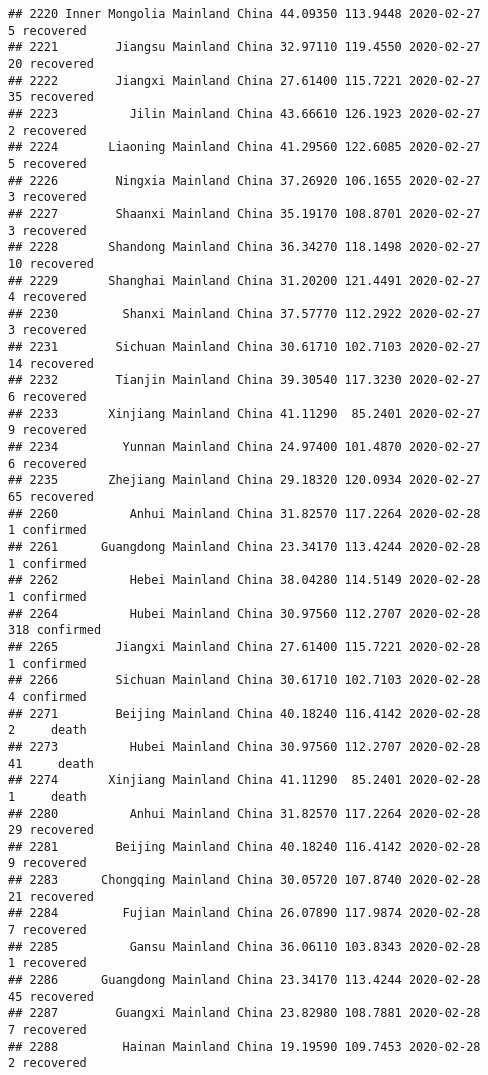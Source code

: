 \documentclass[
]{article}
\begin{document}
\begin{verbatim}
## 2220 Inner Mongolia Mainland China 44.09350 113.9448 2020-02-27     5 recovered
## 2221        Jiangsu Mainland China 32.97110 119.4550 2020-02-27    20 recovered
## 2222        Jiangxi Mainland China 27.61400 115.7221 2020-02-27    35 recovered
## 2223          Jilin Mainland China 43.66610 126.1923 2020-02-27     2 recovered
## 2224       Liaoning Mainland China 41.29560 122.6085 2020-02-27     5 recovered
## 2226        Ningxia Mainland China 37.26920 106.1655 2020-02-27     3 recovered
## 2227        Shaanxi Mainland China 35.19170 108.8701 2020-02-27     3 recovered
## 2228       Shandong Mainland China 36.34270 118.1498 2020-02-27    10 recovered
## 2229       Shanghai Mainland China 31.20200 121.4491 2020-02-27     4 recovered
## 2230         Shanxi Mainland China 37.57770 112.2922 2020-02-27     3 recovered
## 2231        Sichuan Mainland China 30.61710 102.7103 2020-02-27    14 recovered
## 2232        Tianjin Mainland China 39.30540 117.3230 2020-02-27     6 recovered
## 2233       Xinjiang Mainland China 41.11290  85.2401 2020-02-27     9 recovered
## 2234         Yunnan Mainland China 24.97400 101.4870 2020-02-27     6 recovered
## 2235       Zhejiang Mainland China 29.18320 120.0934 2020-02-27    65 recovered
## 2260          Anhui Mainland China 31.82570 117.2264 2020-02-28     1 confirmed
## 2261      Guangdong Mainland China 23.34170 113.4244 2020-02-28     1 confirmed
## 2262          Hebei Mainland China 38.04280 114.5149 2020-02-28     1 confirmed
## 2264          Hubei Mainland China 30.97560 112.2707 2020-02-28   318 confirmed
## 2265        Jiangxi Mainland China 27.61400 115.7221 2020-02-28     1 confirmed
## 2266        Sichuan Mainland China 30.61710 102.7103 2020-02-28     4 confirmed
## 2271        Beijing Mainland China 40.18240 116.4142 2020-02-28     2     death
## 2273          Hubei Mainland China 30.97560 112.2707 2020-02-28    41     death
## 2274       Xinjiang Mainland China 41.11290  85.2401 2020-02-28     1     death
## 2280          Anhui Mainland China 31.82570 117.2264 2020-02-28    29 recovered
## 2281        Beijing Mainland China 40.18240 116.4142 2020-02-28     9 recovered
## 2283      Chongqing Mainland China 30.05720 107.8740 2020-02-28    21 recovered
## 2284         Fujian Mainland China 26.07890 117.9874 2020-02-28     7 recovered
## 2285          Gansu Mainland China 36.06110 103.8343 2020-02-28     1 recovered
## 2286      Guangdong Mainland China 23.34170 113.4244 2020-02-28    45 recovered
## 2287        Guangxi Mainland China 23.82980 108.7881 2020-02-28     7 recovered
## 2288         Hainan Mainland China 19.19590 109.7453 2020-02-28     2 recovered

\end{verbatim}
\end{document}
